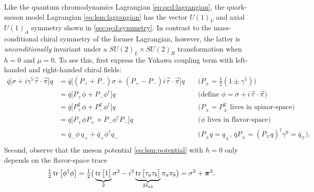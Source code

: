 Like the quantum chromodynamics Lagrangian \eqref{eq:qcd:lagrangian}, the quark-meson model Lagrangian \eqref{eq:lsm:lagrangian} has the vector $U(1)_V$ and axial $U(1)_A$ symmetry shown in \cref{sec:qcd:symmetry}.
In contrast to the mass-conditional chiral symmetry of the former Lagrangian, however, the latter is \emph{unconditionally} invariant under a $SU(2)_L \times SU(2)_R$ transformation when $h=0$ and $\mu = 0$.
To see this, first express the Yukawa coupling term with left-handed and right-handed chiral fields:
\begin{equation}
\begin{aligned}
	\bar{q} \big[\sigma + i \gamma^5 \vec{\tau} \cdot \vec{\pi}\big] q &= \bar{q} \big[ (P_+ + P_-) \sigma + (P_+ - P_-) i \vec{\tau} \cdot \vec{\pi}\big] q && \; \big( P_\pm = \tfrac{1}{2} (1 \pm \gamma^5) \big) \\
	                                                           &= \bar{q} \big[ P_+ \phi + P_- \phi^\dagger\big] q && \; \big( \text{define } \phi=\sigma+i\vec{\tau}\cdot\vec{\pi} \big) \\
	                                                           &= \bar{q} \big[ P_+^2 \phi + P_-^2 \phi^\dagger\big] q && \; \big( \text{$P_\pm=P_\pm^2$ lives in spinor-space} \big) \\
	                                                           &= \bar{q} \big[ P_+ \phi P_+ + P_- \phi^\dagger P_-\big] q && \; \big( \text{$\phi$ lives in flavor-space} \big)\\
	                                                           &= \bar{q}_- \phi \, q_+ + \bar{q}_+ \phi^\dagger q_- && \; \big( \text{$P_\pm q = q_\pm$, $\bar{q} P_\pm = (P_\mp q)^\dagger \gamma^0 = \bar{q}_\mp$} \big).\\
\end{aligned}
\label{eq:lsm:yukawa_symmetry}
\end{equation}
Second, observe that the meson potential \eqref{eq:lsm:potential} with $h=0$ only depends on the flavor-space trace
\begin{equation}
	\tfrac12 \operatorname{tr}\big[\phi^\dagger \phi\big] = \tfrac12 \big( \underbrace{\operatorname{tr}\big[1\big]}_2 \sigma^2 - i^2 \underbrace{\operatorname{tr}\big[\tau_a \tau_b \big]}_{2 \delta_{ab}} \pi_a \pi_b \big) = \sigma^2 + {\bm{\pi}}^2.
\label{eq:lsm:meson_symmetry}
\end{equation}
